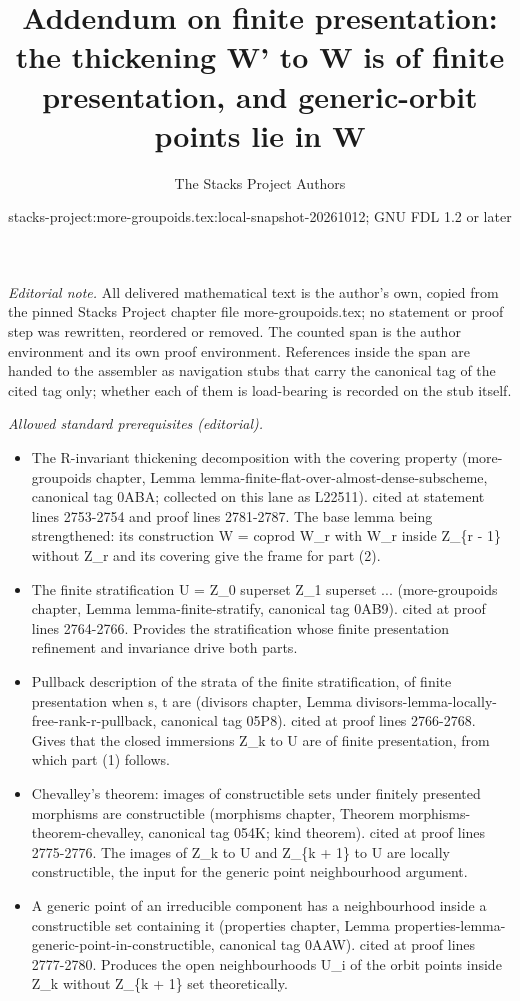 \documentclass{stacks-project}
\title{Addendum on finite presentation: the thickening W' to W is of finite presentation, and generic-orbit points lie in W}
\author{The Stacks Project Authors}
\date{stacks-project:more-groupoids.tex:local-snapshot-20261012; GNU FDL 1.2 or later}
\theoremstyle{plain}
\theoremstyle{definition}
\theoremstyle{remark}
\numberwithin{equation}{subsection}
\begin{document}
\maketitle
\setcounter{subsection}{1}
\noindent\textit{Editorial note.} All delivered mathematical text is the author's own, copied from the pinned Stacks Project chapter file more-groupoids.tex; no statement or proof step was rewritten, reordered or removed. The counted span is the author environment and its own proof environment. References inside the span are handed to the assembler as navigation stubs that carry the canonical tag of the cited tag only; whether each of them is load-bearing is recorded on the stub itself.\par\medskip
\noindent\textit{Allowed standard prerequisites (editorial).}\begin{itemize}
\item The R-invariant thickening decomposition with the covering property (more-groupoids chapter, Lemma lemma-finite-flat-over-almost-dense-subscheme, canonical tag 0ABA; collected on this lane as L22511). cited at statement lines 2753-2754 and proof lines 2781-2787. The base lemma being strengthened: its construction W = coprod W\_r with W\_r inside Z\_\{r - 1\} without Z\_r and its covering give the frame for part (2).
\item The finite stratification U = Z\_0 superset Z\_1 superset ... (more-groupoids chapter, Lemma lemma-finite-stratify, canonical tag 0AB9). cited at proof lines 2764-2766. Provides the stratification whose finite presentation refinement and invariance drive both parts.
\item Pullback description of the strata of the finite stratification, of finite presentation when s, t are (divisors chapter, Lemma divisors-lemma-locally-free-rank-r-pullback, canonical tag 05P8). cited at proof lines 2766-2768. Gives that the closed immersions Z\_k to U are of finite presentation, from which part (1) follows.
\item Chevalley's theorem: images of constructible sets under finitely presented morphisms are constructible (morphisms chapter, Theorem morphisms-theorem-chevalley, canonical tag 054K; kind theorem). cited at proof lines 2775-2776. The images of Z\_k to U and Z\_\{k + 1\} to U are locally constructible, the input for the generic point neighbourhood argument.
\item A generic point of an irreducible component has a neighbourhood inside a constructible set containing it (properties chapter, Lemma properties-lemma-generic-point-in-constructible, canonical tag 0AAW). cited at proof lines 2777-2780. Produces the open neighbourhoods U\_i of the orbit points inside Z\_k without Z\_\{k + 1\} set theoretically.
\end{itemize}\medskip
\end{document}
